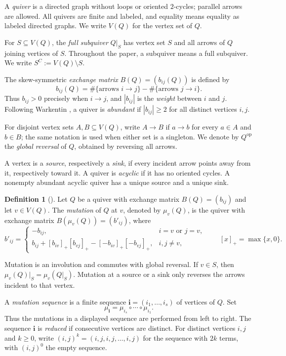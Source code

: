 \documentclass[10pt,a4paper]{amsart}
\theoremstyle{definition}
\newtheorem{definition}[definition]{Definition}
\theoremstyle{definition}
\numberwithin{equation}{section}
\numberwithin{table}{section}
\newcommand{\op}{\mathrm{op}}
\begin{document}
A \emph{quiver} is a directed graph without loops or oriented $2$-cycles;
parallel arrows are allowed. All quivers are finite and labeled, and equality
means equality as labeled directed graphs. We write $V(Q)$ for the vertex set of $Q$.

For $S\subseteq V(Q)$, the \emph{full subquiver} $Q|_S$ has vertex set $S$
and all arrows of $Q$ joining vertices of $S$. Throughout the paper, a
subquiver means a full subquiver. We write $S^C:=V(Q)\setminus S$.

The skew-symmetric \emph{exchange matrix} $B(Q)=(b_{ij}(Q))$ is defined by
\[
 b_{ij}(Q)=\#\{\text{arrows }i\to j\}
           -\#\{\text{arrows }j\to i\}.
\]
Thus $b_{ij}>0$ precisely when $i\to j$, and $|b_{ij}|$ is the \emph{weight}
between $i$ and $j$. Following Warkentin \cite{War14}, a quiver is
\emph{abundant} if $|b_{ij}|\geq2$ for all distinct vertices $i,j$.

For disjoint vertex sets $A,B\subseteq V(Q)$, write $A\to B$ if $a\to b$
for every $a\in A$ and $b\in B$; the same notation is used when either set
is a singleton. We denote by $Q^{\op}$ the \emph{global reversal} of $Q$,
obtained by reversing all arrows.

A vertex is a \emph{source}, respectively a \emph{sink}, if every incident
arrow points away from it, respectively toward it. A quiver is \emph{acyclic}
if it has no oriented cycles. A nonempty abundant acyclic quiver has a
unique source and a unique sink.

\begin{definition}[{\cite{FZ02}}]\label{def:quiver-mutation}
Let $Q$ be a quiver with exchange matrix $B(Q)=(b_{ij})$ and let
$v\in V(Q)$. The \emph{mutation} of $Q$ at $v$, denoted by $\mu_v(Q)$,
is the quiver with exchange matrix $B(\mu_v(Q))=(b'_{ij})$, where
\[
 b'_{ij}=
 \begin{cases}
  -b_{ij},& i=v \text{ or } j=v,\\[1mm]
  b_{ij}+[b_{iv}]_+[b_{vj}]_+-[-b_{iv}]_+[-b_{vj}]_+,
    & i,j\neq v,
 \end{cases}
 \qquad [x]_+=\max\{x,0\}.
\]
\end{definition}

Mutation is an involution and commutes with global reversal. If $v\in S$, then
$\mu_v(Q)|_S=\mu_v(Q|_S)$. Mutation at a source or a sink only reverses the
arrows incident to that vertex.

A \emph{mutation sequence} is a finite sequence
$\mathbf i=(i_1,\ldots,i_s)$ of vertices of $Q$. Set
\[
 \mu_{\mathbf i}=\mu_{i_s}\circ\cdots\circ\mu_{i_1}.
\]
Thus the mutations in a displayed sequence are performed from left to right.
The sequence $\mathbf i$ is \emph{reduced} if consecutive vertices are
distinct. For distinct vertices $i,j$ and $k\geq0$, write
$(i,j)^k=(i,j,i,j,\ldots,i,j)$ for the sequence with $2k$ terms, with
$(i,j)^0$ the empty sequence.
\end{document}

